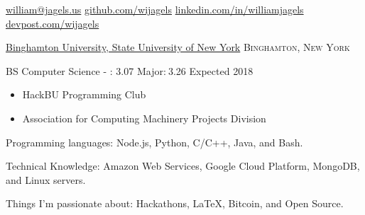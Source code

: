 \documentclass[11pt]{article}
\begin{document}


\nobreakvspace{0.3em}  %

\noindent\href{mailto:william@jagels.us}{william@jagels.us}\sbull
\href{https://github.com/wijagels}{github.com/wijagels}\sbull
\href{https://www.linkedin.com/in/williamjagels}{linkedin.com/in/williamjagels}\sbull
\href{http://devpost.com/wijagels}{devpost.com/wijagels}



\spacedhrule{0.1em}{0.9em}  %

\headedsection
{\href{http://www.binghamton.edu/index.php}{Binghamton University, State University of New York}}
{\textsc{Binghamton, New York}} {
    \headedsubsection
    {BS Computer Science - : 3.07\kern 5pt Major:$\:$3.26}
    {Expected 2018}
    {
        \begin{itemize}
            \item HackBU Programming Club
            \item Association for Computing Machinery Projects Division
        \end{itemize}
    }
}



\spacedhrule{0.1em}{0.9em}  %

\inlineheadsection  %
{Programming languages:}
{ Node.js, Python, C/C++, Java, and Bash.}


\inlineheadsection
{Technical Knowledge:}
{ Amazon Web Services, Google Cloud Platform, MongoDB, and Linux servers. }

\inlineheadsection
{Things I'm passionate about:}
{Hackathons, \LaTeX, Bitcoin, and Open Source.}




\spacedhrule{0.1em}{0.9em}  %
\end{document}
